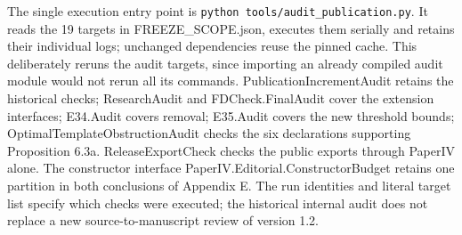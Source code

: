 \documentclass[english,11pt,a4paper]{article}
\begin{document}
The single execution entry point is \mbox{\texttt{python\ tools/audit\_publication.py}}. It reads the 19 targets in {\ttfamily\small FREEZE\_\discretionary{\hbox{\ensuremath{\hookrightarrow}}}{}{}SCOPE.\discretionary{\hbox{\ensuremath{\hookrightarrow}}}{}{}json}, executes them serially and retains their individual logs; unchanged dependencies reuse the pinned cache. This deliberately reruns the audit targets, since importing an already compiled audit module would not rerun all its commands. {\ttfamily\small PublicationI\discretionary{\hbox{\ensuremath{\hookrightarrow}}}{}{}ncrementAudi\discretionary{\hbox{\ensuremath{\hookrightarrow}}}{}{}t} retains the historical checks; {\ttfamily\small ResearchAudi\discretionary{\hbox{\ensuremath{\hookrightarrow}}}{}{}t} and {\ttfamily\small FDCheck.\discretionary{\hbox{\ensuremath{\hookrightarrow}}}{}{}FinalAudit} cover the extension interfaces; {\ttfamily\small E34.\discretionary{\hbox{\ensuremath{\hookrightarrow}}}{}{}Audit} covers removal; {\ttfamily\small E35.\discretionary{\hbox{\ensuremath{\hookrightarrow}}}{}{}Audit} covers the new threshold bounds; {\ttfamily\small OptimalTempl\discretionary{\hbox{\ensuremath{\hookrightarrow}}}{}{}ateObstructi\discretionary{\hbox{\ensuremath{\hookrightarrow}}}{}{}onAudit} checks the six declarations supporting Proposition 6.3a. {\ttfamily\small ReleaseExpor\discretionary{\hbox{\ensuremath{\hookrightarrow}}}{}{}tCheck} checks the public exports through {\ttfamily\small PaperIV} alone. The constructor interface {\ttfamily\small PaperIV.\discretionary{\hbox{\ensuremath{\hookrightarrow}}}{}{}Editorial.\discretionary{\hbox{\ensuremath{\hookrightarrow}}}{}{}ConstructorB\discretionary{\hbox{\ensuremath{\hookrightarrow}}}{}{}udget} retains one partition in both conclusions of Appendix E. The run identities and literal target list specify which checks were executed; the historical internal audit does not replace a new source-to-manuscript review of version 1.2.
\end{document}

